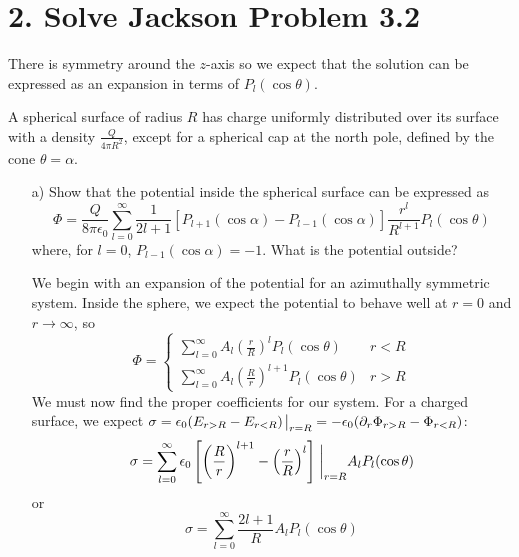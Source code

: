 \documentclass[a4paper,twoside]{article}
\begin{document}
\section*{2. Solve Jackson Problem 3.2}%
\label{sec:solve_jackson_problem_3_2}

There is symmetry around the $z$-axis so we expect that the solution can be expressed as an expansion in terms of $P_l(\cos\theta)$.

\hr

A spherical surface of radius $R$ has charge uniformly distributed over its surface with a density $ \frac{Q}{4\pi R^2}$, except for a spherical cap at the north pole, defined by the cone $\theta = \alpha$.

\begin{itemize}
    \item[a)] Show that the potential inside the spherical surface can be expressed as
        \begin{equation}
            \Phi = \frac{Q}{8\pi\epsilon_0}\sum_{l=0}^{\infty}\frac{1}{2l+1}[P_{l+1}(\cos\alpha)-P_{l-1}(\cos\alpha)] \frac{r^l}{R^{l+1}}P_l(\cos\theta)
        \end{equation}
        where, for $l=0$, $P_{l-1}(\cos\alpha) = -1$. What is the potential outside?

        \begin{tcolorbox}[breakable]
    We begin with an expansion of the potential for an azimuthally symmetric system. Inside the sphere, we expect the potential to behave well at $r=0$ and $r\to\infty$, so
    \begin{equation}
        \Phi = \begin{cases}
            \sum_{l=0}^{\infty} A_l \left( \frac{r}{R} \right)^{l}P_l(\cos\theta) & r<R\\
            \sum_{l=0}^{\infty} A_l \left( \frac{R}{r} \right)^{l+1}P_l(\cos\theta) & r>R 
        \end{cases}
    \end{equation}
    We must now find the proper coefficients for our system. For a charged surface, we expect $\sigma = \epsilon_0 (E_{r>R}-E_{r<R})\eval_{r=R} = -\epsilon_0(\partial_r\Phi_{r>R}-\Phi_{r<R})$:
    \begin{equation}
        \sigma = \sum_{l=0}^{\infty}\epsilon_0\left[\left( \frac{R}{r} \right)^{l+1} -  \left( \frac{r}{R} \right)^l \right]\eval_{r=R}A_l P_l(\cos\theta)
    \end{equation}
    or
    \begin{equation}
        \sigma = \sum_{l=0}^{\infty} \frac{2l+1}{R}A_l P_l(\cos\theta)
    \end{equation}


\end{tcolorbox}
\end{itemize}
\end{document}
